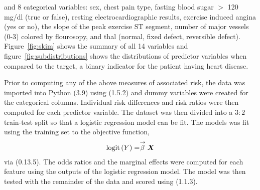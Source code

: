 and 8 categorical variables: sex, chest pain type, fasting blood sugar $>$ 120 mg/dl (true or false), resting electrocardiographic results, exercise induced angina (yes or no), the slope of the peak exercise ST segment, number of major vessels (0-3) colored by flourosopy, and thal (normal, fixed defect, reversible defect).
Figure~\ref{fig:skim} shows the  summary of all 14 variables and figure~\ref{fig:subdistributions} shows the distributions of predictor variables when compared to the target, a binary indicator for the patient having heart disease.

Prior to computing any of the above measures of associated risk, the data was imported into Python (3.9) using  (1.5.2) and dummy variables were created for the categorical columns.
Individual risk differences and risk ratios were then computed for each predictor variable.
The dataset was then divided into a $3:2$ train-test split so that a logistic regression model can be fit.
The models was fit using the training set to the objective function,
\begin{align*}
    \text{logit}\left( Y \right) = \stackrel{\rightarrow}{\beta}\boldsymbol{X}
\end{align*}
via  (0.13.5).
The odds ratios and the marginal effects were computed for each feature using the outputs of the logistic regression model.
The model was then tested with the remainder of the data and scored using  (1.1.3).
